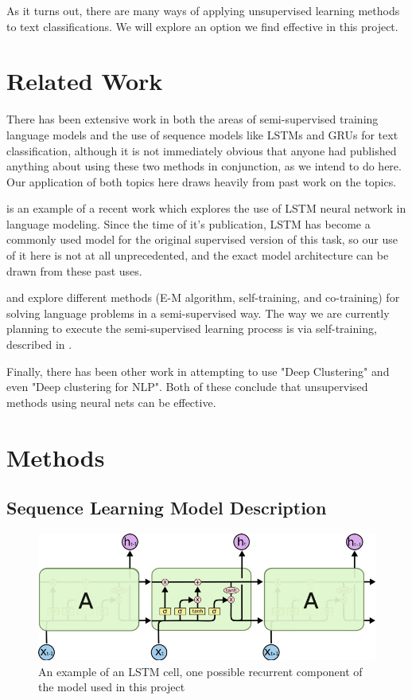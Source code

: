 \documentclass[11pt,letterpaper]{article}
\begin{document}
As it turns out, there are many ways of applying unsupervised learning methods to text classifications. We will explore an option we find effective in this project.


\section{Related Work}

There has been extensive work in both the areas of semi-supervised training language models and the use of sequence models like LSTMs and GRUs for text classification, although it is not immediately obvious that anyone had published anything about using these two methods in conjunction, as we intend to do here. Our application of both topics here draws heavily from past work on the topics. 

\cite{Sundermeyer:12} is an example of a recent work which explores the use of LSTM neural network in language modeling. Since the time of it's publication, LSTM has become a commonly used model for the original supervised version of this task, so our use of it here is not at all unprecedented, and the exact model architecture can be drawn from these past uses.

\cite{Nigam:12} and \cite{mihalcea2004co} explore different methods (E-M algorithm, self-training, and co-training) for solving language problems in a semi-supervised way. The way we are currently planning to execute the semi-supervised learning process is via self-training, described in \cite{mihalcea2004co}.

Finally, there has been other work in attempting to use "Deep Clustering" \cite{xie2016unsupervised} and even "Deep clustering for NLP". \cite{dai2015semi} Both of these conclude that unsupervised methods using neural nets can be effective.

\section{Methods}

\subsection{Sequence Learning Model Description}

\begin{figure}
	\includegraphics[scale = .25]{gru}
	\caption{An example of an LSTM cell, one possible recurrent component of the model used in this project \cite{lstm:15}}
\end{figure}
\end{document}
